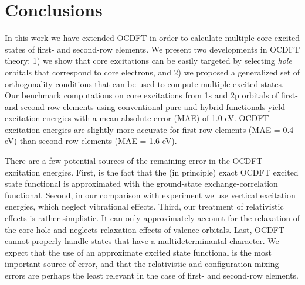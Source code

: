\documentclass[8.5pt,twoside,twocolumn]{article}
\begin{document}
\section{Conclusions}

In this work we have extended OCDFT in order to calculate multiple core-excited states of first- and second-row elements.
We present two developments in OCDFT theory: 1) we show that core excitations can be easily targeted by selecting \textit{hole} orbitals that correspond to core electrons, and 2) we proposed a generalized set of orthogonality conditions that can be used to compute multiple excited states.
Our benchmark computations on core excitations from 1s and 2p orbitals of first- and second-row elements using conventional pure and hybrid functionals yield excitation energies with a mean absolute error (MAE) of 1.0 eV.
OCDFT excitation energies are slightly more accurate for first-row elements (MAE = 0.4 eV) than second-row elements (MAE = 1.6 eV).

There are a few potential sources of the remaining error in the OCDFT excitation energies.  First, is the fact that the (in principle) exact OCDFT excited state functional is approximated with the ground-state exchange-correlation functional.
Second, in our comparison with experiment we use vertical excitation energies, which neglect vibrational effects.
Third, our treatment of relativistic effects is rather simplistic.   It can only approximately account for the relaxation of the core-hole and neglects relaxation effects of valence orbitals.  Last, OCDFT cannot properly handle states that have a multideterminantal character.
We expect that the use of an approximate excited state functional is the most important source of error, and that the relativistic and configuration mixing errors are perhaps the least relevant in the case of first- and second-row elements.
\end{document}

